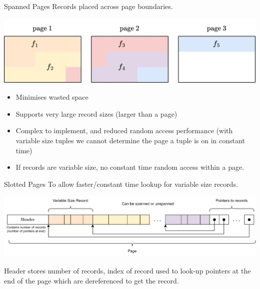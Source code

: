 \begin{definitionbox}{Spanned Pages}
    Records placed across page boundaries.
    \begin{center}
        \includegraphics[width=.8\textwidth]{storage/images/spanned_page.drawio.png}
    \end{center}
    \begin{itemize}
        \item Minimises wasted space
        \item Supports very large record sizes (larger than a page)
        \item Complex to implement, and reduced random access performance (with variable size tuples we cannot determine the page a tuple is on in constant time)
        \item If records are variable size, no constant time random access within a page.
    \end{itemize}
\end{definitionbox}

\begin{definitionbox}{Slotted Pages}
    To allow faster/constant time lookup for variable size records.
    \begin{center}
        \includegraphics[width=\textwidth]{storage/images/slotted_pages.drawio.png}
    \end{center}
    Header stores number of records, index of record used to look-up pointers at the end of the page which are dereferenced to get the record.
\end{definitionbox}

